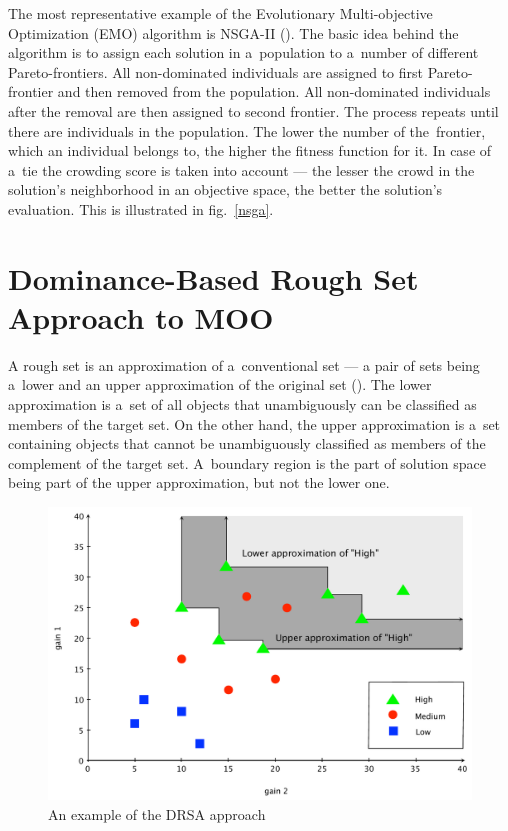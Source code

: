 The most representative example of the Evolutionary Multi-objective
Optimization (EMO) algorithm is NSGA-II (\cite{Deb00}). The basic idea behind
the algorithm is to assign each solution in a~population to a~number of
different Pareto-frontiers. All non-dominated individuals are assigned to
first Pareto-frontier and then removed from the population. All non-dominated
individuals after the removal are then assigned to second frontier. The
process repeats until there are individuals in the population. The lower the
number of the~frontier, which an individual belongs to, the higher the fitness
function for it. In case of a~tie the crowding score is taken into account ---
the lesser the crowd in the solution's neighborhood in an objective space, the
better the solution's evaluation. This is illustrated in fig.~\ref{nsga}.


\section{Dominance-Based Rough Set Approach to MOO}
\label{sec_drsa_in_moo}

A rough set is an approximation of a~conventional set --- a pair of sets being
a~lower and an upper approximation of the original set (\cite{Paw82}). The
lower approximation is a~set of all objects that unambiguously can be
classified as members of the target set. On the other hand, the upper
approximation is a~set containing objects that cannot be unambiguously
classified as members of the complement of the target set.  A~boundary region
is the part of solution space being part of the upper approximation, but not
the lower one.

\begin{figure}
  \centering \includegraphics[scale=0.5]{img/drsa}
  \caption{An example of the DRSA approach}
  \label{drsa}
\end{figure}

